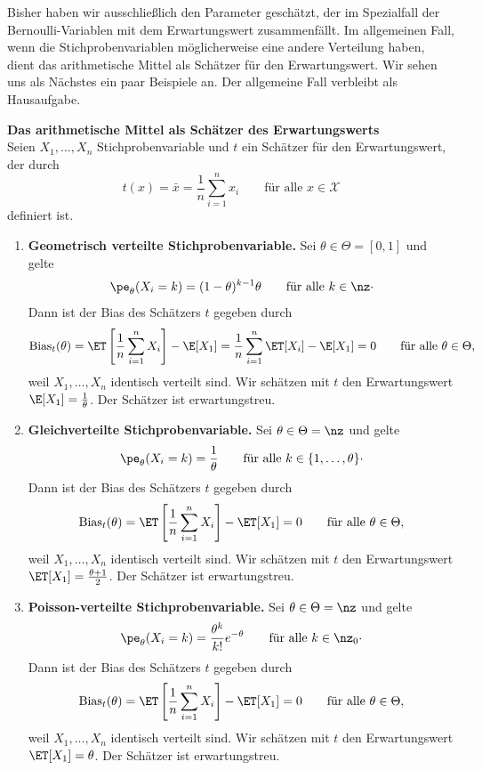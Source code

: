 Bisher haben wir ausschließlich den Parameter geschätzt, der im Spezialfall der \gls{Bernoulli-Variable}n mit dem Erwartungswert zusammenfällt.
Im allgemeinen Fall, wenn die \gls{Stichprobenvariable}n möglicherweise eine andere Verteilung haben, dient das
arithmetische Mittel als \gls{Schätzer} für den Erwartungswert.
Wir sehen uns als Nächstes ein paar Beispiele an.
Der allgemeine Fall verbleibt als Hausaufgabe.

\begin{bsp}\textbf{Das arithmetische Mittel als \gls{Schätzer} des Erwartungswerts}  \\
    Seien $X_1,\dots,X_n$ \gls{Stichprobenvariable} und $t$ ein \gls{Schätzer} für den Erwartungswert, der durch
    \[
        t(x) = \bar x = \frac1n\sum_{i=1}^n x_i \qquad \text{für alle } x\in\mathcal X
    \]
    definiert ist.

    \begin{enumerate}[label=(\alph*)]
        \item \textbf{Geometrisch verteilte Stichprobenvariable.} Sei $\theta\in\Theta=[0,1]$ und gelte
        \[
            \pe_{\theta}(X_i=k) = (1-\theta)^{k-1}\theta \qquad \text{für alle } k\in\nz \cdot
        \]
        Dann ist der Bias des \gls{Schätzer}s $t$ gegeben durch
        \[
            \mathrm{Bias}_t(\theta) = \ET\left[\frac1n\sum_{i=1}^n X_i\right] - \E[X_1] = \frac1n\sum_{i=1}^n \ET[X_i] - \E[X_1] = 0 \qquad \text{für alle } \theta\in\Theta ,
        \]
        weil $X_1,\dots,X_n$ identisch verteilt sind.
        Wir schätzen mit $t$ den Erwartungswert $\E[X_1]=\frac1\theta$.
        Der \gls{Schätzer} ist erwartungstreu.

        \item \textbf{Gleichverteilte Stichprobenvariable.} Sei $\theta\in\Theta=\nz$ und gelte
        \[
            \pe_{\theta}(X_i=k) = \frac1\theta \qquad \text{für alle } k\in\{1,\dots,\theta\} \cdot
        \]
        Dann ist der Bias des \gls{Schätzer}s $t$ gegeben durch
        \[
            \mathrm{Bias}_t(\theta) = \ET\left[\frac1n\sum_{i=1}^n X_i\right] - \ET[X_1] = 0 \qquad \text{für alle } \theta\in\Theta ,
        \]
        weil $X_1,\dots,X_n$ identisch verteilt sind.
        Wir schätzen mit $t$ den Erwartungswert $\ET[X_1]=\frac{\theta+1}{2}$.
        Der \gls{Schätzer} ist erwartungstreu.

        \item \textbf{Poisson-verteilte Stichprobenvariable.} Sei $\theta\in\Theta=\nz$ und gelte
        \[
            \pe_{\theta}(X_i=k) = \frac{\theta^k}{k!}e^{-\theta} \qquad \text{für alle } k\in\nz_0 \cdot
        \]
        Dann ist der Bias des \gls{Schätzer}s $t$ gegeben durch
        \[
            \mathrm{Bias}_t(\theta) = \ET\left[\frac1n\sum_{i=1}^n X_i\right] - \ET[X_1] = 0 \qquad \text{für alle } \theta\in\Theta ,
        \]
        weil $X_1,\dots,X_n$ identisch verteilt sind.
        Wir schätzen mit $t$ den Erwartungswert $\ET[X_1]=\theta$.
        Der \gls{Schätzer} ist erwartungstreu.
    \end{enumerate}
\end{bsp}

